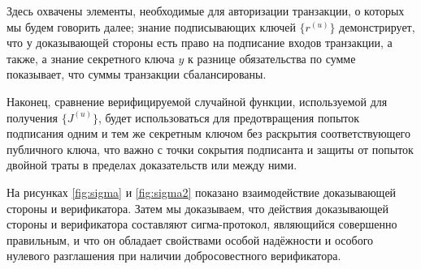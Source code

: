 \documentclass{article}
\theoremstyle{definition}
\begin{document}
Здесь охвачены элементы, необходимые для авторизации транзакции, о которых мы будем говорить далее; знание подписывающих ключей $\{r^{(u)}\}$ демонстрирует, что у доказывающей стороны есть право на подписание входов транзакции, а также, а знание секретного ключа $y$ к разнице обязательства по сумме показывает, что суммы транзакции сбалансированы.

Наконец, сравнение верифицируемой случайной функции, используемой для получения $\{J^{(u)}\}$, будет использоваться для предотвращения попыток подписания одним и тем же секретным ключом без раскрытия соответствующего публичного ключа, что важно с точки сокрытия подписанта и защиты от попыток двойной траты в пределах доказательств или между ними.

На рисунках \ref{fig:sigma} и \ref{fig:sigma2} показано взаимодействие доказывающей стороны и верификатора. Затем мы доказываем, что действия доказывающей стороны и верификатора составляют сигма-протокол, являющийся совершенно правильным, и что он обладает свойствами особой надёжности и особого нулевого разглашения при наличии добросовестного верификатора.
\end{document}
